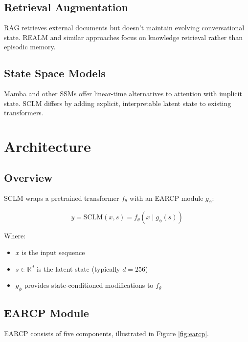 \documentclass[11pt,a4paper]{article}
\begin{document}
\subsection{Retrieval Augmentation}

RAG \cite{lewis2020retrieval} retrieves external documents but doesn't maintain evolving conversational state. REALM and similar approaches focus on knowledge retrieval rather than episodic memory.

\subsection{State Space Models}

Mamba \cite{gu2023mamba} and other SSMs offer linear-time alternatives to attention with implicit state. SCLM differs by adding explicit, interpretable latent state to existing transformers.

\section{Architecture}

\subsection{Overview}

SCLM wraps a pretrained transformer $f_\theta$ with an EARCP module $g_\phi$:

\begin{equation}
    y = \text{SCLM}(x, s) = f_\theta(x \mid g_\phi(s))
\end{equation}

Where:
\begin{itemize}
    \item $x$ is the input sequence
    \item $s \in \mathbb{R}^d$ is the latent state (typically $d=256$)
    \item $g_\phi$ provides state-conditioned modifications to $f_\theta$
\end{itemize}

\subsection{EARCP Module}

EARCP consists of five components, illustrated in Figure \ref{fig:earcp}.
\end{document}
